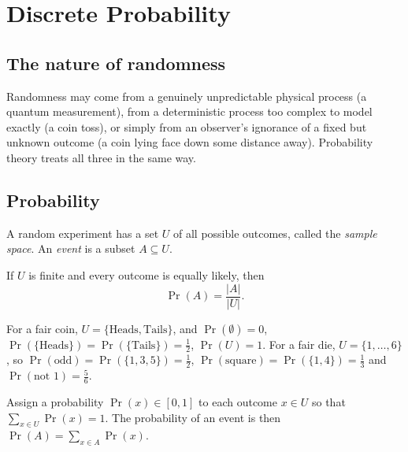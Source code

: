 \newpage
\section{Discrete Probability}
\label{sec:probability}

\subsection{The nature of randomness}
\label{sec:9-1}

\begin{note}
Randomness may come from a genuinely unpredictable physical process (a quantum measurement), from a deterministic process too complex to model exactly (a coin toss), or simply from an observer's ignorance of a fixed but unknown outcome (a coin lying face down some distance away). Probability theory treats all three in the same way.
\end{note}

\subsection{Probability}
\label{sec:9-2}

\begin{definition}
A random experiment has a set $U$ of all possible outcomes, called the \emph{sample space}. An \emph{event} is a subset $A\subseteq U$.
\end{definition}

\begin{definition}
If $U$ is finite and every outcome is equally likely, then
\[
\Pr(A) = \frac{|A|}{|U|}.
\]
\end{definition}

\begin{example}
For a fair coin, $U=\{\text{Heads},\text{Tails}\}$, and $\Pr(\emptyset)=0$, $\Pr(\{\text{Heads}\})=\Pr(\{\text{Tails}\})=\frac12$, $\Pr(U)=1$. For a fair die, $U=\{1,\dots,6\}$, so $\Pr(\text{odd})=\Pr(\{1,3,5\})=\frac12$, $\Pr(\text{square})=\Pr(\{1,4\})=\frac13$ and $\Pr(\text{not }1)=\frac56$.
\end{example}

\begin{definition}
Assign a probability $\Pr(x)\in[0,1]$ to each outcome $x\in U$ so that $\sum_{x\in U}\Pr(x)=1$. The probability of an event is then $\Pr(A)=\sum_{x\in A}\Pr(x)$.
\end{definition}

